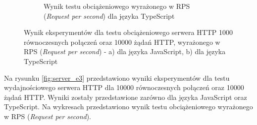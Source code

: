 \begin{figure}[H]
\begin{subfigure}[b]{0.42\textwidth}
    \caption{Wynik testu obciążeniowego wyrażonego w RPS (\textit{Request per second}) dla języka TypeScript}
    \label{fig:server_e2_ts}
  \end{subfigure}
  \caption{Wynik eksperymentów dla testu obciążeniowego serwera HTTP 1000 równoczesnych połączeń oraz 10000 żądań HTTP, wyrażonego w RPS (\textit{Request per second}) - a) dla języka JavaScript, b) dla języka TypeScript}
  \label{fig:server_e2}
\end{figure}

Na rysunku \ref{fig:server_e3} przedstawiono wyniki eksperymentów dla testu wydajnościowego serwera HTTP dla 10000 równoczesnych połączeń oraz 10000 żądań HTTP. Wyniki zostały przedstawione zarówno dla języka JavaScript oraz TypeScript. Na wykresach przedstawiono wynik testu obciążeniowego wyrażonego w RPS (\textit{Request per second}).

